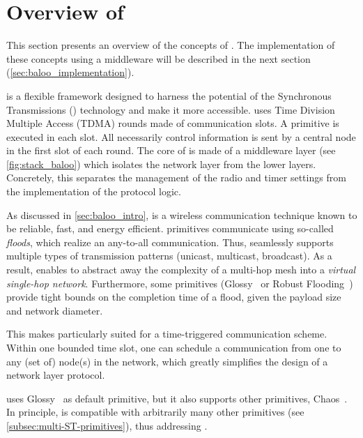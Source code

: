 
\section{Overview of \baloo}
\label{sec:baloo_overview}

This section presents an overview of the concepts of \baloo. The implementation of these concepts using a middleware will be described in the next section (\cref{sec:baloo_implementation}).

\baloo is a flexible framework designed to harness the potential of the Synchronous Transmissions (\ST) technology and make it more accessible.
\baloo uses Time Division Multiple Access (TDMA) rounds made of communication slots. A \ST primitive is executed in each slot.
All necessarily control information is sent by a central node in the first slot of each round.
The core of \baloo is made of a middleware layer (see \cref{fig:stack_baloo}) which isolates the network layer from the lower layers. Concretely, this separates the management of the radio and timer settings from the implementation of the protocol logic.

As discussed in \cref{sec:baloo_intro}, \ST is a wireless communication technique known to be reliable, fast, and energy efficient.
%
\ST primitives communicate using so-called \textsl{floods}, which realize an any-to-all communication. Thus, \ST seamlessly supports multiple types of transmission patterns (\ie unicast, multicast, broadcast).
As a result, \ST enables to abstract away the complexity of a multi-hop mesh into a \textsl{virtual single-hop network}.
%
Furthermore, some \ST primitives (\eg Glossy~\cite{ferrari2011Glossy} or Robust Flooding~\cite{lim2017Competition}) provide tight bounds on the completion time of a flood, given the payload size and network diameter.

This makes \ST particularly suited for a time-triggered communication scheme. Within one bounded time slot, one can schedule a communication from one to any (set of) node(s) in the network, which greatly simplifies the design of a network layer protocol.

\baloo uses Glossy~\cite{ferrari2011Glossy} as default \ST primitive, but it also supports other primitives, \eg Chaos~\cite{landsiedel2013Chaos}. In principle, \baloo is compatible with arbitrarily many other primitives (see \cref{subsec:multi-ST-primitives}), thus addressing .

